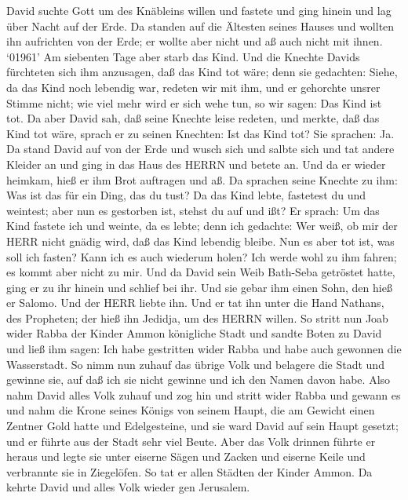 David suchte Gott um des Knäbleins willen und fastete und ging hinein
und lag über Nacht auf der Erde.  Da standen auf die
Ältesten seines Hauses und wollten ihn aufrichten von der Erde; er
wollte aber nicht und aß auch nicht mit ihnen.  `01961' Am
siebenten Tage aber starb das Kind. Und die Knechte Davids fürchteten
sich ihm anzusagen, daß das Kind tot wäre; denn sie gedachten: Siehe, da
das Kind noch lebendig war, redeten wir mit ihm, und er gehorchte unsrer
Stimme nicht; wie viel mehr wird er sich wehe tun, so wir sagen: Das
Kind ist tot.  Da aber David sah, daß seine Knechte leise
redeten, und merkte, daß das Kind tot wäre, sprach er zu seinen
Knechten: Ist das Kind tot? Sie sprachen: Ja.  Da stand
David auf von der Erde und wusch sich und salbte sich und tat andere
Kleider an und ging in das Haus des HERRN und betete an. Und da er
wieder heimkam, hieß er ihm Brot auftragen und aß.  Da
sprachen seine Knechte zu ihm: Was ist das für ein Ding, das du tust? Da
das Kind lebte, fastetest du und weintest; aber nun es gestorben ist,
stehst du auf und ißt?  Er sprach: Um das Kind fastete ich
und weinte, da es lebte; denn ich gedachte: Wer weiß, ob mir der HERR
nicht gnädig wird, daß das Kind lebendig bleibe.  Nun es
aber tot ist, was soll ich fasten? Kann ich es auch wiederum holen? Ich
werde wohl zu ihm fahren; es kommt aber nicht zu mir.  Und
da David sein Weib Bath-Seba getröstet hatte, ging er zu ihr hinein und
schlief bei ihr. Und sie gebar ihm einen Sohn, den hieß er Salomo. Und
der HERR liebte ihn.  Und er tat ihn unter die Hand
Nathans, des Propheten; der hieß ihn Jedidja, um des HERRN willen.
 So stritt nun Joab wider Rabba der Kinder Ammon königliche
Stadt  und sandte Boten zu David und ließ ihm sagen: Ich
habe gestritten wider Rabba und habe auch gewonnen die Wasserstadt.
 So nimm nun zuhauf das übrige Volk und belagere die Stadt
und gewinne sie, auf daß ich sie nicht gewinne und ich den Namen davon
habe.  Also nahm David alles Volk zuhauf und zog hin und
stritt wider Rabba und gewann es  und nahm die Krone seines
Königs von seinem Haupt, die am Gewicht einen Zentner Gold hatte und
Edelgesteine, und sie ward David auf sein Haupt gesetzt; und er führte
aus der Stadt sehr viel Beute.  Aber das Volk drinnen
führte er heraus und legte sie unter eiserne Sägen und Zacken und
eiserne Keile und verbrannte sie in Ziegelöfen. So tat er allen Städten
der Kinder Ammon. Da kehrte David und alles Volk wieder gen Jerusalem.

